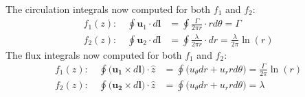 \documentclass{article}
\begin{document}
The circulation integrals now computed for both $f_1$ and $f_2$:
\begin{align*}
    f_1(z):\quad \oint \mathbf{u}_1\cdot d\mathbf{l} &= \oint \frac{\Gamma}{2\pi r}\cdot rd\theta = \Gamma\\
    f_2(z):\quad \oint\mathbf{u}_2\cdot d\mathbf{l} &= \oint \frac{\lambda}{2\pi r}\cdot dr = \frac{\lambda}{2\pi}\ln(r)
\end{align*}
The flux integrals now computed for both $f_1$ and $f_2$:
\begin{align*}
    f_1(z):\quad \oint \Big(\mathbf{u_1}\times d\mathbf{l}\Big)\cdot \hat{z} &= \oint \Big(u_\theta dr + u_r r d\theta\Big)= \frac{\Gamma}{2\pi}\ln(r)\\
    f_2(z):\quad \oint \Big(\mathbf{u_2}\times d\mathbf{l}\Big)\cdot \hat{z} &= \oint \Big(u_\theta dr + u_r r d\theta\Big)= \lambda
\end{align*}
\end{document}
